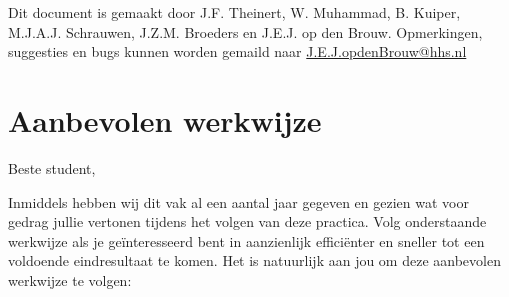 \documentclass[a4paper,10pt,fleqn,twoside]{article}
\begin{document}
\tableofcontents

\vfill
Dit document is gemaakt door J.F. Theinert, W. Muhammad, B. Kuiper, M.J.A.J. Schrauwen, J.Z.M. Broeders en J.E.J. op den Brouw.
Opmerkingen, suggesties en bugs kunnen worden gemaild naar \href{mailto:J.E.J.opdenBrouw@hhs.nl}{J.E.J.opdenBrouw@hhs.nl}



\section*{Aanbevolen werkwijze}

Beste student,

Inmiddels hebben wij dit vak al een aantal jaar gegeven en gezien wat voor gedrag jullie vertonen tijdens het volgen van deze practica. Volg onderstaande werkwijze als je geïnteresseerd bent in aanzienlijk efficiënter en sneller tot een voldoende eindresultaat te komen. Het is natuurlijk aan jou om deze aanbevolen werkwijze te volgen:
\end{document}
